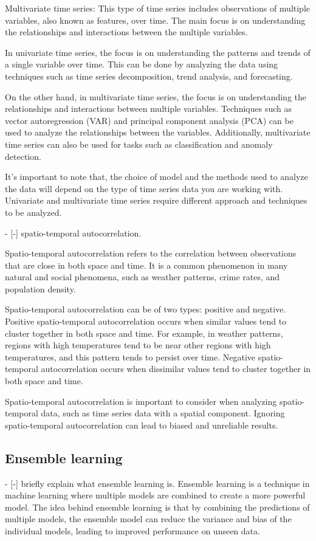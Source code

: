 Multivariate time series: This type of time series includes observations of multiple variables, also known as features, over time. The main focus is on understanding the relationships and interactions between the multiple variables.

In univariate time series, the focus is on understanding the patterns and trends of a single variable over time. This can be done by analyzing the data using techniques such as time series decomposition, trend analysis, and forecasting.

On the other hand, in multivariate time series, the focus is on understanding the relationships and interactions between multiple variables. Techniques such as vector autoregression (VAR) and principal component analysis (PCA) can be used to analyze the relationships between the variables. Additionally, multivariate time series can also be used for tasks such as classification and anomaly detection.

It's important to note that, the choice of model and the methods used to analyze the data will depend on the type of time series data you are working with. Univariate and multivariate time series require different approach and techniques to be analyzed.

- [-] spatio-temporal autocorrelation.

Spatio-temporal autocorrelation refers to the correlation between observations that are close in both space and time. It is a common phenomenon in many natural and social phenomena, such as weather patterns, crime rates, and population density.

Spatio-temporal autocorrelation can be of two types: positive and negative. Positive spatio-temporal autocorrelation occurs when similar values tend to cluster together in both space and time. For example, in weather patterns, regions with high temperatures tend to be near other regions with high temperatures, and this pattern tends to persist over time. Negative spatio-temporal autocorrelation occurs when dissimilar values tend to cluster together in both space and time.

Spatio-temporal autocorrelation is important to consider when analyzing spatio-temporal data, such as time series data with a spatial component. Ignoring spatio-temporal autocorrelation can lead to biased and unreliable results.

\subsection{Ensemble learning}
- [-] briefly explain what ensemble learning is.
Ensemble learning is a technique in machine learning where multiple models are combined to create a more powerful model. The idea behind ensemble learning is that by combining the predictions of multiple models, the ensemble model can reduce the variance and bias of the individual models, leading to improved performance on unseen data.

